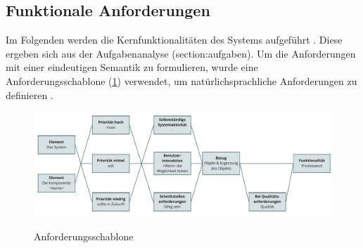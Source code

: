 \subsection*{Funktionale Anforderungen}
\label{section:funktionale}
Im Folgenden werden die Kernfunktionalitäten des Systems aufgeführt \cite{balzert2009}.
Diese ergeben sich aus der Aufgabenanalyse (section:aufgaben). Um die Anforderungen mit einer eindeutigen Semantik zu formulieren, wurde eine Anforderungsschablone (\ref{fig:schablone}) verwendet, um natürlichsprachliche Anforderungen zu definieren \cite{balzert2009}.

\begin{figure}[h]
        \centering
        \includegraphics[scale=0.45]{Bilder/anforderungsschablone.pdf}
        \label{fig:schablone}
        \caption[Anforderungsschablone]{Anforderungsschablone \cite{balzert2009}}
\end{figure}

